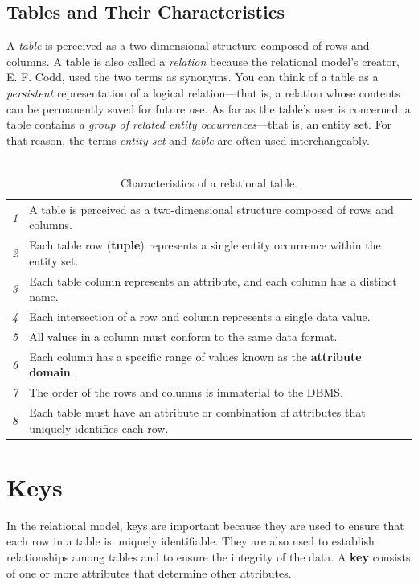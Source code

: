 \documentclass[a4paper, 12pt, titlepage]{report}
\begin{document}
\subsection{Tables and Their Characteristics}
A \emph{table} is perceived as a two-dimensional structure composed of rows and columns. A table is also called a \emph{relation} because the relational model’s creator, E. F. Codd, used the two terms as synonyms. You can think of a table as a \emph{persistent} representation of a logical relation—that is, a relation whose contents can be permanently saved for future use. As far as the table’s user is concerned, a table contains \emph{a group of related entity occurrences}—that is, an entity set. For that reason, the terms \emph{entity set} and \emph{table} are often used interchangeably.\\ \\
\begin{center}
\begin{longtable}{ p{0cm} p{14cm} }
\caption{Characteristics of a relational table.\label{long}}\\
\toprule
\toprule
\emph{1} & A table is perceived as a two-dimensional structure composed of rows and columns.\\ 
\emph{2} & Each table row (\textbf{tuple}) represents a single entity occurrence within the entity set.\\
\emph{3} & Each table column represents an attribute, and each column has a distinct name.\\
\emph{4} & Each intersection of a row and column represents a single data value.\\
\emph{5} & All values in a column must conform to the same data format.\\
\emph{6} & Each column has a specific range of values known as the \textbf{attribute domain}.\\ 
\emph{7} & The order of the rows and columns is immaterial to the DBMS.\\
\emph{8} & Each table must have an attribute or combination of attributes that uniquely identifies each row.\\
\bottomrule
\bottomrule
\end{longtable}
\end{center}

\section{Keys}
In the relational model, keys are important because they are used to ensure that each row in a table is uniquely identifiable. They are also used to establish relationships among tables and to ensure the integrity of the data. A \textbf{key} consists of one or more attributes that determine other attributes.
\end{document}
